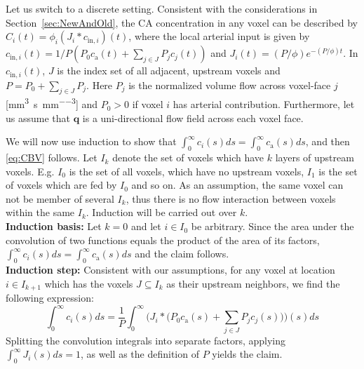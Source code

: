\documentclass[10pt]{article}
\begin{document}
	Let us switch to a discrete setting.
	Consistent with the considerations in Section~\ref{sec:NewAndOld}, the CA concentration in any voxel can be described by $C_i(t) = \phi_i(J_i\ast c_{\mathrm{in},i})(t)$, where the local arterial input is given by
		$c_{\mathrm{in},i}(t) =1/P(P_0 c_\mathrm{a}(t) + \sum_{j \in J} P_jc_j(t))$ and $J_i(t)=(P/\phi)e^{- (P/\phi)t}$.
	In $c_{\mathrm{in},i}(t)$, $J$ is the index set of all adjacent, upstream voxels and $P=P_0 + \sum_{j\in J} P_j$.
	Here $P_j$ is the normalized volume flow across voxel-face $j$ [\si{\milli\meter\cubed\per\second\per\milli\meter\cubed}] and $P_0>0$ if voxel $i$ has arterial contribution.
	Furthermore, let us assume that $\mathbf{q}$ is a uni-directional flow field across each voxel face.
	
		We will now use induction to show that $\int_0^\infty c_i(s) d s = \int_0^\infty c_\mathrm{a}(s) d s$, and then \eqref{eq:CBV} follows.
		Let $I_k$ denote the set of voxels which have $k$ layers of upstream voxels.
		E.g. $I_0$ is the set of all voxels, which have no upstream voxels, $I_1$ is the set of voxels which are fed by $I_0$ and so on. As an assumption, the same voxel can not be member of several $I_k$, thus there is no flow interaction between voxels within the same $I_k$.
		Induction will be carried out over $k$.\\
		\textbf{Induction basis:}
		Let $k=0$ and let $i \in I_0$ be arbitrary.
		Since the area under the convolution of two functions equals the product of the area of its factors, $\int_0^\infty c_i(s) d s = \int_0^\infty c_\mathrm{a}(s) d s$ and the claim follows.\\
		\textbf{Induction step:}
		Consistent with our assumptions, for any voxel at location $i \in I_{k+1}$ which has the voxels $J \subseteq I_{k}$ as their upstream neighbors, we find the following expression:
		\begin{equation}
			\int_0^\infty c_i(s) d s = \frac{1}{P}\int_0^\infty \Big(J_i\ast \big( P_0 c_\mathrm{a}(s) + {\textstyle\sum\limits_{j \in J}}P_j c_j(s) \big)\Big)(s) d s
		\end{equation}
		 Splitting the convolution integrals into separate factors, applying $\int_0^{\infty}J_i(s)d s = 1$, as well as the definition of $P$ yields the claim.
	
\end{document}
